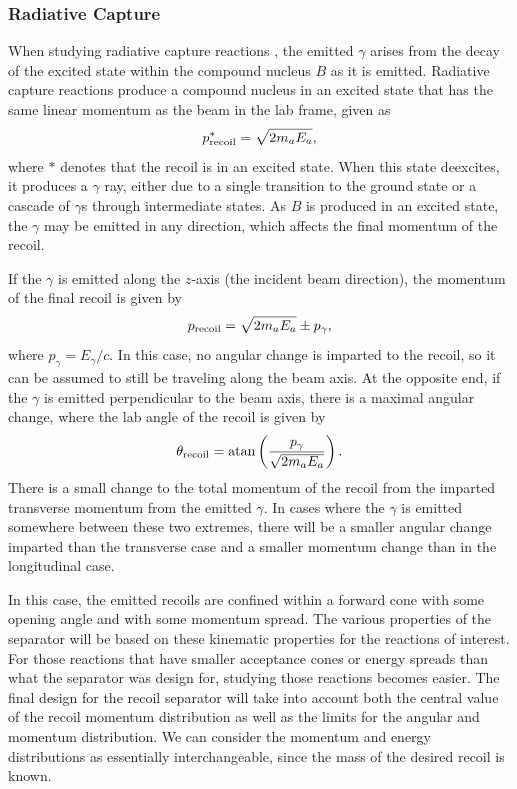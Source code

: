 \subsubsection{Radiative Capture}
When studying radiative capture reactions , the
emitted $\gamma$ arises from the decay of the excited state within the
compound nucleus $B$ as it is emitted. Radiative capture reactions
produce a compound nucleus in an excited state that has the same linear
momentum as the beam in the lab frame, given as
\[
    p^*_{\rm{recoil}} = \sqrt{2m_aE_a},
\]
where $*$ denotes that the recoil is in an excited state. When this
state deexcites, it produces a $\gamma$ ray, either due to a single
transition to the ground state or a cascade of $\gamma$s through
intermediate states. As $B$ is produced in an excited state, the
$\gamma$ may be emitted in any direction, which affects the final
momentum of the recoil.

If the $\gamma$ is emitted along the $z$-axis (the incident beam
direction), the momentum of the final recoil is given by
\[
    p_{{\rm recoil}} = \sqrt{2m_aE_a} \pm p_{\gamma},
\]
where $p_{\gamma} = E_{\gamma}/c$. In this case, no angular change is
imparted to the recoil, so it can be assumed to still be traveling along
the beam axis. At the opposite end, if the $\gamma$ is emitted
perpendicular to the beam axis, there is a maximal angular change, where
the lab angle of the recoil is given by
\[
    \theta_{{\rm recoil}} = {\rm atan}\left(\frac{p_{\gamma}}{\sqrt{2m_aE_a}}\right).
\]
There is a small change to the total momentum of the recoil from the
imparted transverse momentum from the emitted $\gamma$. In cases where
the $\gamma$ is emitted somewhere between these two extremes, there will
be a smaller angular change imparted than the transverse case and a
smaller momentum change than in the longitudinal case.

In this case, the emitted recoils are confined within a forward cone
with some opening angle and with some momentum spread. The various
properties of the separator will be based on these kinematic properties
for the reactions of interest. For those reactions that have smaller
acceptance cones or energy spreads than what the separator was design
for, studying those reactions becomes easier. The final design for the
recoil separator will take into account both the central value of the
recoil momentum distribution as well as the limits for the angular and
momentum distribution. We can consider the momentum and energy
distributions as essentially interchangeable, since the mass of the
desired recoil is known.

